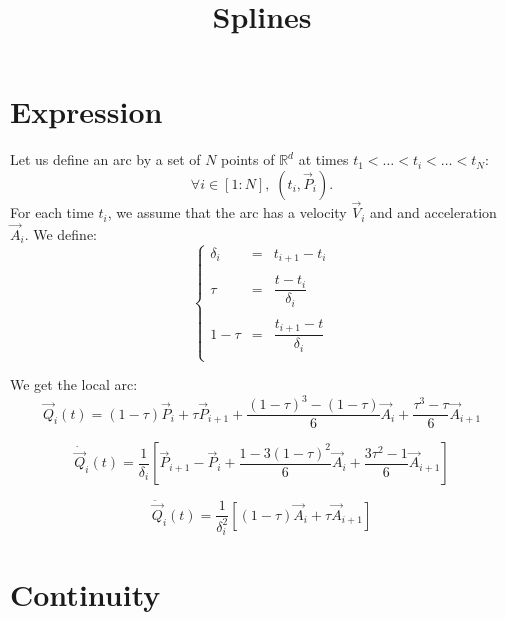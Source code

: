 \documentclass[aps,onecolumn]{revtex4}
\begin{document}
\title{Splines}
\maketitle

\section{Expression}

Let us define an arc by a set of $N$ points of $\mathbb{R}^d$ at times $t_1<\ldots<t_i<\ldots<t_N$:
\begin{equation}
	\forall i \in [1:N],\;	(t_i,\vec{P}_i).
\end{equation}
For each time $t_i$, we assume that the arc has a velocity $\vec{V}_i$ and and acceleration $\vec{A}_i$.
We define:
\begin{equation}
\left\lbrace
\begin{array}{rcl}
	\delta_i & = & t_{i+1}-t_{i}\\
	\\
	\tau     & = & \dfrac{t-t_{i}}{\delta_i}\\
	\\
	1-\tau   & = & \dfrac{t_{i+1}-t}{\delta_i}\\
\end{array}
\right.
\end{equation}
		
We get the local arc:
\begin{equation}
	\vec{Q}_i(t) = (1-\tau) \vec{P}_i + \tau \vec{P}_{i+1} + \dfrac{ (1-\tau)^3 - (1-\tau) }{6} \vec{A}_{i} + \dfrac{\tau^3-\tau}{6} \vec{A}_{i+1}
\end{equation}	

\begin{equation}
	\dot{\vec{Q}}_i(t) = \dfrac{1}{\delta_i} \left[ \vec{P}_{i+1} - \vec{P}_i + \dfrac{1-3(1-\tau)^2}{6}\vec{A}_i + \dfrac{3\tau^2-1}{6} \vec{A}_{i+1}\right]
\end{equation}

\begin{equation}
	\ddot{\vec{Q}}_i(t) = \dfrac{1}{\delta_i^2} \left[ (1-\tau) \vec{A}_i + \tau \vec{A}_{i+1} \right]
\end{equation}

\section{Continuity}
\end{document}
